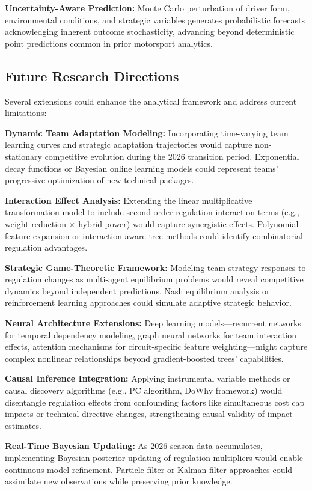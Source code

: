 \documentclass[conference]{IEEEtran}
\begin{document}
\textbf{Uncertainty-Aware Prediction:} Monte Carlo perturbation of driver form, environmental conditions, and strategic variables generates probabilistic forecasts acknowledging inherent outcome stochasticity, advancing beyond deterministic point predictions common in prior motorsport analytics.

\subsection{Future Research Directions}

Several extensions could enhance the analytical framework and address current limitations:

\textbf{Dynamic Team Adaptation Modeling:} Incorporating time-varying team learning curves and strategic adaptation trajectories would capture non-stationary competitive evolution during the 2026 transition period. Exponential decay functions or Bayesian online learning models could represent teams' progressive optimization of new technical packages.

\textbf{Interaction Effect Analysis:} Extending the linear multiplicative transformation model to include second-order regulation interaction terms (e.g., weight reduction $\times$ hybrid power) would capture synergistic effects. Polynomial feature expansion or interaction-aware tree methods could identify combinatorial regulation advantages.

\textbf{Strategic Game-Theoretic Framework:} Modeling team strategy responses to regulation changes as multi-agent equilibrium problems would reveal competitive dynamics beyond independent predictions. Nash equilibrium analysis or reinforcement learning approaches could simulate adaptive strategic behavior.

\textbf{Neural Architecture Extensions:} Deep learning models—recurrent networks for temporal dependency modeling, graph neural networks for team interaction effects, attention mechanisms for circuit-specific feature weighting—might capture complex nonlinear relationships beyond gradient-boosted trees' capabilities.

\textbf{Causal Inference Integration:} Applying instrumental variable methods or causal discovery algorithms (e.g., PC algorithm, DoWhy framework) would disentangle regulation effects from confounding factors like simultaneous cost cap impacts or technical directive changes, strengthening causal validity of impact estimates.

\textbf{Real-Time Bayesian Updating:} As 2026 season data accumulates, implementing Bayesian posterior updating of regulation multipliers would enable continuous model refinement. Particle filter or Kalman filter approaches could assimilate new observations while preserving prior knowledge.
\end{document}
